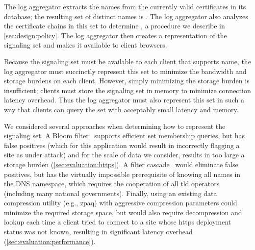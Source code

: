 The log aggregator extracts the names from the currently valid
certificates in its database;
the resulting set of distinct names is \httpsset. 
The log aggregator also analyzes the certificate chains
in this set to determine \multicertset, a procedure we describe in
\autoref{sec:design:policy}. The log aggregator then creates a representation of
the signaling set and makes it available to client browsers.

Because the signaling set must be available to each client that supports \ac{name},
the log aggregator must succinctly represent this set to minimize the bandwidth and storage burdens on
each client. However, simply minimizing the storage burden is insufficient;
clients must store the signaling set in memory to minimize connection latency
overhead. Thus the log aggregator must also represent this set in such a way
that clients can query the set with acceptably small latency and memory.

We considered several approaches when determining how to represent the signaling
set. A Bloom filter~\cite{bloom1970space} supports efficient set membership
queries, but has false positives (which for this application would result in
incorrectly flagging a site as under attack) and for the scale of data we
consider, results in too large a storage burden
(\autoref{sec:evaluation:https}). A filter cascade~\cite{salikhov2014using}
would eliminate false positives, but has the virtually impossible prerequisite
of knowing all names in the DNS namespace, which requires the cooperation of all
\ac{tld} operators (including many national governments). Finally, using an
existing data compression utility (e.g., zpaq) with aggressive compression
parameters could minimize the required storage space, but would also require
decompression and lookup each time a client tried to connect to a site whose
\ac{https} deployment status was not known, resulting in significant latency
overhead (\autoref{sec:evaluation:performance}).


